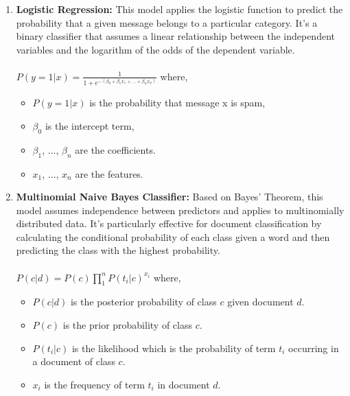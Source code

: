 \documentclass[12pt]{article}
\begin{document}
\begin{enumerate}
\setlength\itemsep{1em}
    \item \textbf{Logistic Regression:} This model applies the logistic function to predict the probability that a given message belongs to a particular category. It's a binary classifier that assumes a linear relationship between the independent variables and the logarithm of the odds of the dependent variable.\cite{Molnar_2023} \\\\
    $P(y=1|x) = \frac{1}{1 + e^{-(\beta_0 + \beta_1 x_1 + \ldots + \beta_n x_n)}}$
    where,
    \begin{itemize}
    \setlength\itemsep{0.5em}
        \item $P(y=1|x)$ is the probability that message x is spam,
        \item $\beta_0$ is the intercept term, 
        \item $\beta_1$, ..., $\beta_n$ are the coefficients.
        \item $x_1$, ..., $x_n$ are the features.
    \end{itemize}
    
    \item \textbf{Multinomial Naive Bayes Classifier:} Based on Bayes' Theorem, this model assumes independence between predictors and applies to multinomially distributed data. It's particularly effective for document classification by calculating the conditional probability of each class given a word and then predicting the class with the highest probability.\cite{Chauhan_2022}
    \\\\
    $P(c|d) = P(c) \prod_{1}^{n} P(t_i|c)^{x_i}$
    where,
    \begin{itemize}
    \setlength\itemsep{0.5em}
        \item $P(c|d)$ is the posterior probability of class $c$ given document $d$.
        \item $P(c)$ is the prior probability of class $c$.
        \item $P(t_i|c)$ is the likelihood which is the probability of term $t_i$ occurring in a document of class $c$.
        \item $x_i$ is the frequency of term $t_i$ in document $d$. 
    \end{itemize}


\end{enumerate}
\end{document}
